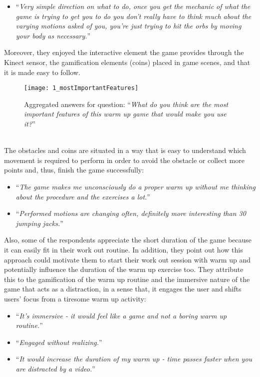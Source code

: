 \begin{itemize}
\item ``\textit{Very simple direction on what to do, once you get the mechanic of what the game is trying to get you to do you don't really have to think much about the varying motions asked of you, you're just trying to hit the orbs by moving your body as necessary.}''
\end{itemize} 
Moreover, they enjoyed the interactive element the game provides through the Kinect sensor, the gamification elements (coins) placed in game scenes, and that it is made easy to follow. \\
\begin{figure}[h]
    \centering
    \texttt{[image: 1\_mostImportantFeatures]}
    \caption{Aggregated answers for question: ``\textit{What do you think are the most important features of this warm up game that would make you use it?}''}
    \label{fig:1_mostImportantFeatures}
\end{figure}\\The obstacles and coins are situated in a way that is easy to understand which movement is required to perform in order to avoid the obstacle or collect more points and, thus, finish the game successfully:
\begin{itemize}
\item ``\textit{The game makes me unconsciously do a proper warm up without me thinking about the procedure and the exercises a lot.}''
\item ``\textit{Performed motions are changing often, definitely more interesting than 30 jumping jacks.}''
\end{itemize} 
Also, some of the respondents appreciate the short duration of the game because it can easily fit in their work out routine. In addition, they point out how this approach could motivate them to start their work out session with warm up and potentially influence the duration of the warm up exercise too. They attribute this to the gamification of the warm up routine and the immersive nature of the game that acts as a distraction, in a sense that, it engages the user and shifts users' focus from a tiresome warm up activity:  
\begin{itemize}
\item ``\textit{It's immersive - it would feel like a game and not a boring warm up routine.}''
\item ``\textit{Engaged without realizing.}''
\item ``\textit{It would increase the duration of my warm up - time passes faster when you are distracted by a video.}''
\end{itemize} 
